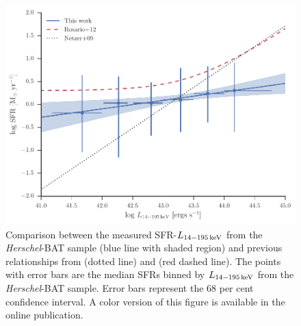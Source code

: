 \documentclass[fleqn, usenatbib]{mnras}
\newcommand{\herschel}{\emph{Herschel}}
\begin{document}

\begin{figure}
\includegraphics{figures/lbat_sfr_correlation_compare_lit}
\caption{Comparison between the measured SFR-$L_{\rm 14-195\,keV}$ from the \herschel-BAT sample (blue line with shaded region) and previous relationships from \citet{Netzer:2009lr} (dotted line) and \citet{Rosario:2012fr} (red dashed line). The points with error bars are the median SFRs binned by $L_{\rm 14-195\,keV}$ from the \herschel-BAT sample. Error bars represent the 68 per cent confidence interval.  A color version of this figure is available in the online publication.\label{fig:sfr_lbat_correlation_lit}}
\end{figure}


\end{document}

